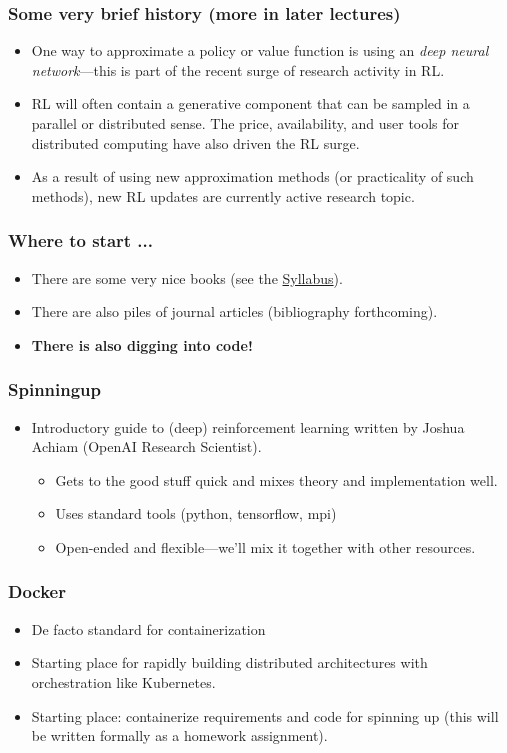 \documentclass{beamer}
\begin{document}
\begin{frame}
  \frametitle{Some very brief history (more in later lectures)}
  \begin{itemize}
  \item One way to approximate a policy or value function is using an {\em
      deep neural network}---this is part of the recent surge of research activity in RL.
  \item RL will often contain a generative component that can be sampled in a
    parallel or distributed sense. The price, availability, and user tools for
    distributed computing have also driven the RL surge.
  \item As a result of using new approximation methods (or practicality of such methods),
    new RL updates are currently active research topic.
  \end{itemize}
\end{frame}

\begin{frame}
  \frametitle{Where to start ...}
  \begin{itemize}
  \item There are some very nice books (see the
    \href{https://github.com/jhineman/spring2019ece590hineman}{Syllabus}).
  \item There are also piles of journal articles (bibliography forthcoming).
  \item {\bf There is also digging into code!}
  \end{itemize}
\end{frame}

\begin{frame}
  \frametitle{Spinningup}
  \begin{itemize}
  \item Introductory guide to (deep) reinforcement learning written by Joshua Achiam (OpenAI
    Research Scientist).
    \begin{itemize}
    \item Gets to the good stuff quick and mixes theory and implementation well.
    \item Uses standard tools (python, tensorflow, mpi)
    \item Open-ended and flexible---we'll mix it together with other resources.
    \end{itemize}
  \end{itemize}
\end{frame}

\begin{frame}
  \frametitle{Docker}
  \begin{itemize}
  \item De facto standard for containerization
  \item Starting place for rapidly building distributed architectures with orchestration like
    Kubernetes.
  \item Starting place: containerize requirements and code for spinning up (this will be
    written formally as a homework assignment). 
  \end{itemize}
\end{frame}
\end{document}
